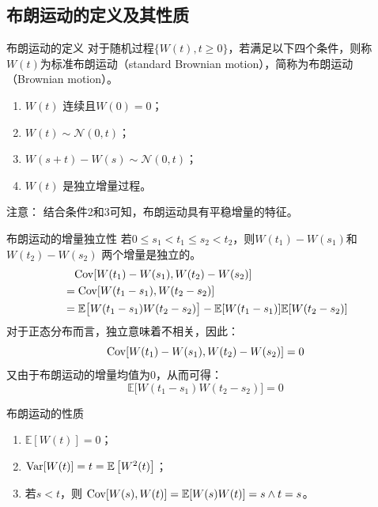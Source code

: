 \documentclass[t]{beamer}
\newcommand{\E}{\mathbb{E}}
\begin{document}
\subsection{布朗运动的定义及其性质}
\begin{frame}{布朗运动的定义}
  对于随机过程$\{W(t),t\ge 0\}$，若满足以下四个条件，则称$W(t)$为标准布朗运动（standard Brownian motion），简称为布朗运动（Brownian motion）。
  \begin{enumerate}
  \item $W(t)$ 连续且$W(0)=0$；
  \item $W(t)\sim \mathcal{N}(0,t)$； 	 
  \item $W(s+t)-W(s)\sim \mathcal{N}(0,t)$； 
  \item $W(t)$  是独立增量过程。
  \end{enumerate} 
  \begin{block}{注意：}
    结合条件2和3可知，布朗运动具有平稳增量的特征。
  \end{block}
\end{frame}


\begin{frame}{布朗运动的增量独立性}
  若$0\le s_1<t_1\le s_2<t_2$，则$W(t_1)-W(s_1)$和$W(t_2)-W(s_2)$ 两个增量是独立的。
  \[\begin{split}
    &\quad {\rm Cov}[W(t_1)-W(s_1), W(t_2)-W(s_2)]\\
    &={\rm Cov}[W(t_1-s_1), W(t_2-s_2)]\\
    &=\E \big[W(t_1-s_1)W(t_2-s_2)\big]-\E [W(t_1-s_1)] \E [W(t_2-s_2)]\\
    \end{split} \]
    对于正态分布而言，独立意味着不相关，因此：
    $${\rm Cov}[W(t_1)-W(s_1), W(t_2)-W(s_2)]=0$$
    又由于布朗运动的增量均值为0，从而可得：
    \[\E \big[W(t_1-s_1)W(t_2-s_2)\big]=0 \]
\end{frame}


\begin{frame}{布朗运动的性质}
  \begin{enumerate}
    \item  $ \E [W(t)]=0$；
    \item $ {\rm Var}[W(t)]=t=\E \left[W^{2}(t)\right]$；
    \item 若$s<t$，则 ${\rm Cov}[W(s), W(t)]=\E [W(s) W(t)]=s\wedge t=s$。
    \end{enumerate}
\end{frame}
\end{document}
